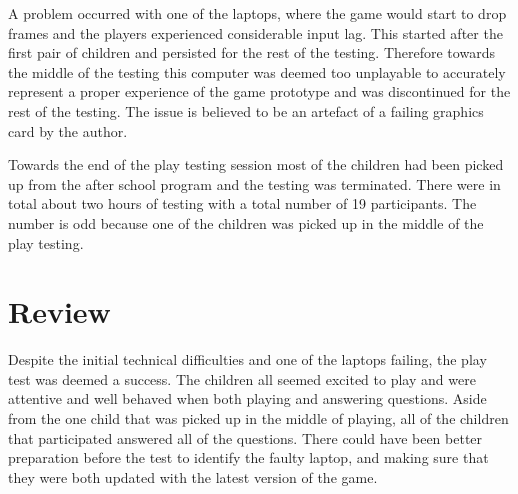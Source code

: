 
A problem occurred with one of the laptops, where the game would start to drop frames and the players experienced considerable input lag. This started after the first pair of children and persisted for the rest of the testing. Therefore towards the middle of the testing this computer was deemed too unplayable to accurately represent a proper experience of the game prototype and was discontinued for the rest of the testing. The issue is believed to be an artefact of a failing graphics card by the author.

Towards the end of the play testing session most of the children had been picked up from the after school program and the testing was terminated. There were in total about two hours of testing with a total number of 19 participants. The number is odd because one of the children was picked up in the middle of the play testing.


\section{Review}
Despite the initial technical difficulties and one of the laptops failing, the play test was deemed a success. The children all seemed excited to play and were attentive and well behaved when both playing and answering questions. Aside from the one child that was picked up in the middle of playing, all of the children that participated answered all of the questions. There could have been better preparation before the test to identify the faulty laptop, and making sure that they were both updated with the latest version of the game.